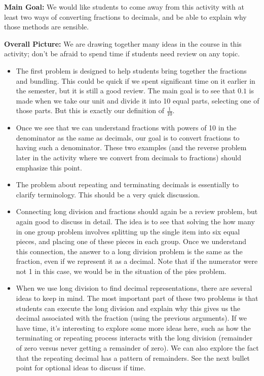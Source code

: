 \documentclass[noauthor, nooutcomes]{ximera}
\begin{document}
 \newpage
\begin{instructorNotes}

{\bf Main Goal:} We would like students to come away from this activity with at least two ways of converting fractions to decimals, and be able to explain why those methods are sensible.

{\bf Overall Picture:} We are drawing together many ideas in the course in this activity; don't be afraid to spend time if students need review on any topic.

 \begin{itemize}
 \item The first problem is designed to help students bring together the fractions and bundling. This could be quick if we spent significant time on it earlier in the semester, but it is still a good review. The main goal is to see that $0.1$ is made when we take our unit and divide it into 10 equal parts, selecting one of those parts. But this is exactly our definition of $\frac{1}{10}$.
 \item Once we see that we can understand fractions with powers of 10 in the denominator as the same as decimals, our goal is to convert fractions to having such a denominator. These two examples (and the reverse problem later in the activity where we convert from decimals to fractions) should emphasize this point.
 \item The problem about repeating and terminating decimals is essentially to clarify terminology. This should be a very quick discussion.
 
 \item Connecting long division and fractions should again be a review problem, but again good to discuss in detail. The idea is to see that solving the how many in one group problem involves splitting up the single item into six equal pieces, and placing one of these pieces in each group. Once we understand this connection, the answer to a long division problem is the same as the fraction, even if we represent it as a decimal. Note that if the numerator were not 1 in this case, we would be in the situation of the pies problem.
 
 \item When we use long division to find decimal representations, there are several ideas to keep in mind. The most important part of these two problems is that students can execute the long division and explain why this gives us the decimal associated with the fraction (using the previous arguments). If we have time, it's interesting to explore some more ideas here, such as how the terminating or repeating process interacts with the long division (remainder of zero versus never getting a remainder of zero). We can also explore the fact that the repeating decimal has a pattern of remainders. See the next bullet point for optional ideas to discuss if time.
 

\end{itemize}
\end{instructorNotes}
\end{document}
